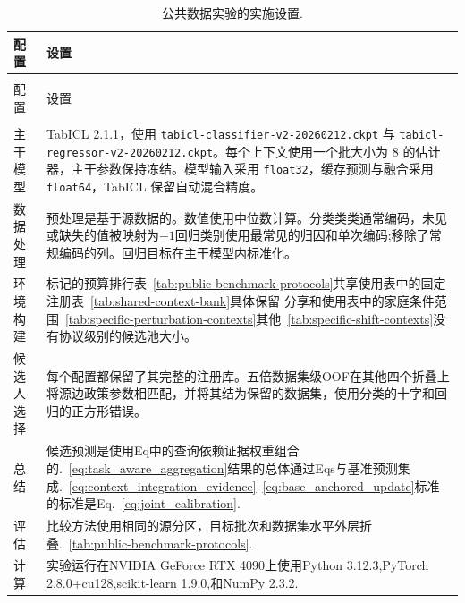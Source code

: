 \begingroup
  \scriptsize
  \setlength{\tabcolsep}{5pt}
  \renewcommand{\arraystretch}{1.0}
  \setlength{\LTpre}{0.45\baselineskip}
  \setlength{\LTpost}{0.45\baselineskip}
  \begin{longtable}{@{}>{\raggedright\arraybackslash}p{}
                      >{\raggedright\arraybackslash}p{}@{}}
    \caption{公共数据实验的实施设置.}
    \label{tab:implementation-details} \\
    \toprule 配置&设置\\
    \midrule
    \endfirsthead
    \multicolumn{2}{@{}l}{\tablename~\thetable\ （续）} \\
    \toprule 配置&设置\\
    \midrule
    \endhead
    \midrule
    \multicolumn{2}{r@{}}{在下一页继续} \\
    \endfoot
    \bottomrule
    \endlastfoot
    主干模型
      & TabICL 2.1.1，使用 \nolinkurl{tabicl-classifier-v2-20260212.ckpt} 与
        \nolinkurl{tabicl-regressor-v2-20260212.ckpt}。每个上下文使用一个批大小为 8 的估计器，主干参数保持冻结。模型输入采用 \texttt{float32}，缓存预测与融合采用 \texttt{float64}，TabICL 保留自动混合精度。\\
数据处理&预处理是基于源数据的。数值使用中位数计算。分类类类通常编码，未见或缺失的值被映射为$-1$回归类别使用最常见的归因和单次编码;移除了常规编码的列。回归目标在主干模型内标准化。\\
环境构建&标记的预算排行表~\ref{tab:public-benchmark-protocols}共享使用表中的固定注册表~\ref{tab:shared-context-bank}具体保留 分享和使用表中的家庭条件范围~\ref{tab:specific-perturbation-contexts}其他~\ref{tab:specific-shift-contexts}没有协议级别的候选池大小。\\
候选人选择&每个配置都保留了其完整的注册库。五倍数据集级OOF在其他四个折叠上将源边政策参数相匹配，并将其结为保留的数据集，使用分类的十字和回归的正方形错误。\\
总结&候选预测是使用Eq中的查询依赖证据权重组合的.~\eqref{eq:task_aware_aggregation}结果的总体通过Eqs与基准预测集成.~\eqref{eq:context_integration_evidence}--\eqref{eq:base_anchored_update}标准的标准是Eq.~\eqref{eq:joint_calibration}. \\
评估&比较方法使用相同的源分区，目标批次和数据集水平外层折叠.~\ref{tab:public-benchmark-protocols}. \\
计算 & 实验运行在NVIDIA GeForce RTX 4090上使用Python 3.12.3,PyTorch 2.8.0+cu128,scikit-learn 1.9.0,和NumPy 2.3.2. \\
  \end{longtable}
\endgroup

